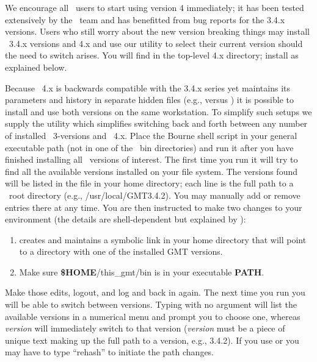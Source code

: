 We encourage all \GMT\ users to start using version 4 immediately; it has been tested extensively by
the \GMT\ team and has benefitted from bug reports for the 3.4.x versions.  Users who still worry about the
new version breaking things may install \GMT\ 3.4.x versions and 4.x and use our utility 
to select their current version should the need to switch arises.  You will find 
in the top-level \GMT 4.x directory; install as explained below.

Because \GMT\ 4.x is backwards compatible with the 3.4.x series yet maintains its parameters
and history in separate hidden files (e.g.,  versus )
it is possible to install and use both versions on the same workstation.  To simplify such
setups we supply the utility  which simplifies switching back and forth
between any number of installed \GMT\ 3-versions and \GMT\ 4.x.  Place the  Bourne
shell script in your
general executable path (not in one of the \GMT\ bin directories) and run it after you have
finished installing all \GMT\ versions of interest.  The first time you run 
it will try to find all the available versions installed on your file system.  The versions
found will be listed in the file  in your home directory; each line
is the full path to a \GMT\ root directory (e.g., /usr/local/GMT3.4.2).  You may
manually add or remove entries there at any time.  You are then instructed to make two
changes to your environment (the details are shell-dependent but explained by ):
\begin{enumerate}
\item {} creates and maintains a symbolic link  in your home
directory that will point to a directory with one of the installed GMT versions.
\item Make sure {\bf \$HOME}/this\_gmt/bin is in your executable {\bf PATH}.
\end{enumerate}
Make those edits, logout, and log and back in again.  The next time you run 
you will be able to switch between versions.  Typing  with no argument will list the
available versions in a numerical menu and prompt you to choose one, whereas  {\it version}
will immediately switch to that version ({\it version} must be a piece of unique text making
up the full path to a version, e.g., 3.4.2).  If you use  or  you may have to type
``rehash'' to initiate the path changes.
